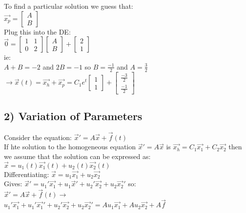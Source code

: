 \documentclass[12pt]{article}
\begin{document}
	To find a particular solution we guess that:\\
	$\overrightarrow{x_p} = \begin{bmatrix}
	A \\ B
	\end{bmatrix}$\\
	
	Plug this into the DE:\\
	$\overrightarrow{0} = \begin{bmatrix}
	1 & 1 \\ 0 & 2
	\end{bmatrix} \begin{bmatrix}
	A \\ B
	\end{bmatrix}  + \begin{bmatrix}
	2 \\ 1
	\end{bmatrix}$\\
	
	ie:\\
	$A + B = -2$ and $2B = -1$ so $B = \frac{-1}{2}$ and $A = \frac{3}{2}$\\
	$\rightarrow \overrightarrow{x}(t) = \overrightarrow{x_h} + \overrightarrow{x_p} = C_1e^t \begin{bmatrix}
	1 \\ 1
	\end{bmatrix} + \begin{bmatrix}
	\frac{-3}{2} \\ \frac{-1}{2}
	\end{bmatrix}$\\
	
	\subsection*{2) Variation of Parameters}
	Consider the equation: $\overrightarrow{x}' = A\overrightarrow{x} + \overrightarrow{f}(t)$\\
	If hte solution to the homogeneous equation $\overrightarrow{x}' = A\overrightarrow{x}$ is $\overrightarrow{x_h} = C_1\overrightarrow{x_1} + C_2\overrightarrow{x_2}$ then we assume that the solution can be expressed as: $\overrightarrow{x} = u_1(t)\overrightarrow{x_1}(t) + u_2(t)\overrightarrow{x_2}(t)$\\
	
	Differentiating: $\overrightarrow{x} = u_1 \overrightarrow{x_1} + u_2 \overrightarrow{x_2}$\\
	Gives: $\overrightarrow{x}' = u_1'\overrightarrow{x_1} + u_1\overrightarrow{x}' + u_2'\overrightarrow{x_2} + u_2\overrightarrow{x_2}'$ so:\\
	$\overrightarrow{x}' = A\overrightarrow{x} + \overrightarrow{f}(t) \rightarrow$\\
	$u_1'\overrightarrow{x_1} + u_1' \overrightarrow{x_1}' + u_2'\overrightarrow{x_2} + u_2 \overrightarrow{x_2}' = Au_1\overrightarrow{x_1} + Au_2\overrightarrow{x_2} + A\overrightarrow{f}$\\
	
\end{document}
